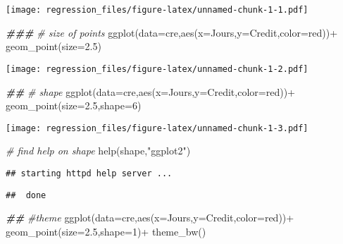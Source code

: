\documentclass[
]{article}
\newenvironment{Shaded}{\begin{snugshade}}{\end{snugshade}}
\newcommand{\AttributeTok}[1]{\textcolor[rgb]{0.77,0.63,0.00}{#1}}
\newcommand{\CommentTok}[1]{\textcolor[rgb]{0.56,0.35,0.01}{\textit{#1}}}
\newcommand{\DecValTok}[1]{\textcolor[rgb]{0.00,0.00,0.81}{#1}}
\newcommand{\DocumentationTok}[1]{\textcolor[rgb]{0.56,0.35,0.01}{\textbf{\textit{#1}}}}
\newcommand{\FloatTok}[1]{\textcolor[rgb]{0.00,0.00,0.81}{#1}}
\newcommand{\FunctionTok}[1]{\textcolor[rgb]{0.00,0.00,0.00}{#1}}
\newcommand{\NormalTok}[1]{#1}
\newcommand{\SpecialCharTok}[1]{\textcolor[rgb]{0.00,0.00,0.00}{#1}}
\newcommand{\StringTok}[1]{\textcolor[rgb]{0.31,0.60,0.02}{#1}}
\begin{document}
\texttt{[image: regression\_files/figure-latex/unnamed-chunk-1-1.pdf]}

\begin{Shaded}
\begin{Highlighting}[]
\DocumentationTok{\#\#\#}
\CommentTok{\# size of points}
\FunctionTok{ggplot}\NormalTok{(}\AttributeTok{data=}\NormalTok{cre,}\FunctionTok{aes}\NormalTok{(}\AttributeTok{x=}\NormalTok{Jours,}\AttributeTok{y=}\NormalTok{Credit,}\AttributeTok{color=}\StringTok{\textquotesingle{}red\textquotesingle{}}\NormalTok{))}\SpecialCharTok{+}
  \FunctionTok{geom\_point}\NormalTok{(}\AttributeTok{size=}\FloatTok{2.5}\NormalTok{)}
\end{Highlighting}
\end{Shaded}

\texttt{[image: regression\_files/figure-latex/unnamed-chunk-1-2.pdf]}

\begin{Shaded}
\begin{Highlighting}[]
\DocumentationTok{\#\#}
\CommentTok{\# shape}
\FunctionTok{ggplot}\NormalTok{(}\AttributeTok{data=}\NormalTok{cre,}\FunctionTok{aes}\NormalTok{(}\AttributeTok{x=}\NormalTok{Jours,}\AttributeTok{y=}\NormalTok{Credit,}\AttributeTok{color=}\StringTok{\textquotesingle{}red\textquotesingle{}}\NormalTok{))}\SpecialCharTok{+}
  \FunctionTok{geom\_point}\NormalTok{(}\AttributeTok{size=}\FloatTok{2.5}\NormalTok{,}\AttributeTok{shape=}\DecValTok{6}\NormalTok{)}
\end{Highlighting}
\end{Shaded}

\texttt{[image: regression\_files/figure-latex/unnamed-chunk-1-3.pdf]}

\begin{Shaded}
\begin{Highlighting}[]
\CommentTok{\# find help on shape}
\FunctionTok{help}\NormalTok{(shape,}\StringTok{"ggplot2"}\NormalTok{)}
\end{Highlighting}
\end{Shaded}

\begin{verbatim}
## starting httpd help server ...
\end{verbatim}

\begin{verbatim}
##  done
\end{verbatim}

\begin{Shaded}
\begin{Highlighting}[]
\DocumentationTok{\#\#}
\CommentTok{\#theme}
\FunctionTok{ggplot}\NormalTok{(}\AttributeTok{data=}\NormalTok{cre,}\FunctionTok{aes}\NormalTok{(}\AttributeTok{x=}\NormalTok{Jours,}\AttributeTok{y=}\NormalTok{Credit,}\AttributeTok{color=}\StringTok{\textquotesingle{}red\textquotesingle{}}\NormalTok{))}\SpecialCharTok{+}
  \FunctionTok{geom\_point}\NormalTok{(}\AttributeTok{size=}\FloatTok{2.5}\NormalTok{,}\AttributeTok{shape=}\DecValTok{1}\NormalTok{)}\SpecialCharTok{+}
  \FunctionTok{theme\_bw}\NormalTok{()}
\end{Highlighting}
\end{Shaded}
\end{document}
